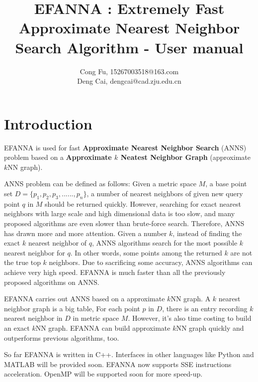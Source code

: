 \documentclass{article}
\begin{document}
\title{EFANNA : Extremely Fast Approximate Nearest Neighbor Search Algorithm - User manual}
\author{Cong Fu, 15267003518@163.com\\Deng Cai, dengcai@cad.zju.edu.cn}
\maketitle

\section{Introduction}
EFANNA is used for fast \textbf{Approximate Nearest Neighbor Search} (ANNS) problem based on a \textbf{Approximate $k$ Neatest Neighbor Graph} (approximate $k$NN graph).

ANNS problem can be defined as follows: Given a metric space $M$, a base point set $D=\{p_1, p_2, p_3, ...... , p_n\}$, a number of nearest neighbors of given new query point $q$ in $M$ should be returned quickly. However, searching for exact nearest neighbors with large scale and high dimensional data is too slow, and many proposed algorithms are even slower than brute-force search. Therefore, ANNS has drawn more and more attention. Given a number $k$, instead of finding the exact $k$ nearest neighbor of $q$, ANNS algorithms search for the most possible $k$ nearest neighbor for $q$. In other words, some points among the returned $k$ are not the true top $k$ neighbors. Due to sacrificing some accuracy, ANNS algorithms can achieve very high speed. EFANNA is much faster than all the previously proposed algorithms on ANNS.

EFANNA carries out ANNS based on a approximate $k$NN graph. A $k$ nearest neighbor graph is a big table, For each point $p$ in $D$, there is an entry recording $k$ nearest neighbor in $D$ in metric space $M$. However, it's also time costing to build an exact $k$NN graph. EFANNA can build approximate $k$NN graph quickly and outperforms previous algorithms, too.

So far EFANNA is written in C++. Interfaces in other languages like Python and MATLAB will be provided soon. EFANNA now supports SSE instructions acceleration. OpenMP will be supported soon for more speed-up.
\end{document}
